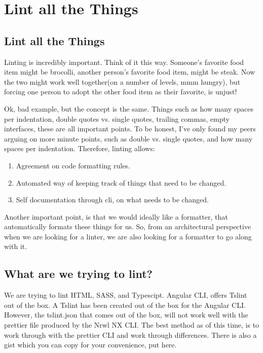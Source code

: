 \maketitle{}
\section{ Lint all the Things }

\subsection{ Lint all the Things }

Linting is incredibly important. Think of it this way. Someone's favorite food
item might be brocolli, another person's favorite food item, might be steak.
Now the two might work well together(on a number of levels, mmm hungry), but
forcing one person to adopt the other food item as their favorite, is unjust!

Ok, bad example, but the concept is the same. Things such as how many spaces per
indentation, double quotes vs. single quotes, trailing commas, empty interfaces,
these are all important points. To be honest, I've only found my peers arguing
on more minute points, such as double vs. single quotes, and how many spaces
per indentation. Therefore, linting allows:
\begin{enumerate}
  \item Agreement on code formatting rules.
  \item Automated way of keeping track of things that need to be changed.
  \item Self documentation through cli, on what needs to be changed.
\end{enumerate}

Another important point, is that we would ideally like a formatter, that
automatically formats these things for us. So, from an architectural perspective
when we are looking for a linter, we are also looking for a formatter to go along
with it.

\subsection{ What are we trying to lint? }
We are trying to lint HTML, SASS, and Typescipt. Angular CLI, offers Tslint out
of the box. A Tslint has been created out of the box for the Angular CLI.
However, the tslint.json that comes out of the box, will not work well with the
prettier file produced by the Nrwl NX CLI. The best method as of this time, is to
work through with the prettier CLI and work through differences. There is also
a gist which you can copy for your convenience, put here.

